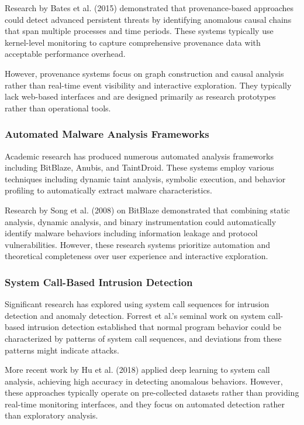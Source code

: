 Research by Bates et al. (2015) demonstrated that provenance-based approaches could detect advanced persistent threats by identifying anomalous causal chains that span multiple processes and time periods. These systems typically use kernel-level monitoring to capture comprehensive provenance data with acceptable performance overhead.

However, provenance systems focus on graph construction and causal analysis rather than real-time event visibility and interactive exploration. They typically lack web-based interfaces and are designed primarily as research prototypes rather than operational tools.

\subsubsection{Automated Malware Analysis Frameworks}
Academic research has produced numerous automated analysis frameworks including BitBlaze, Anubis, and TaintDroid. These systems employ various techniques including dynamic taint analysis, symbolic execution, and behavior profiling to automatically extract malware characteristics.

Research by Song et al. (2008) on BitBlaze demonstrated that combining static analysis, dynamic analysis, and binary instrumentation could automatically identify malware behaviors including information leakage and protocol vulnerabilities. However, these research systems prioritize automation and theoretical completeness over user experience and interactive exploration.

\subsubsection{System Call-Based Intrusion Detection}
Significant research has explored using system call sequences for intrusion detection and anomaly detection. Forrest et al.'s seminal work on system call-based intrusion detection established that normal program behavior could be characterized by patterns of system call sequences, and deviations from these patterns might indicate attacks.

More recent work by Hu et al. (2018) applied deep learning to system call analysis, achieving high accuracy in detecting anomalous behaviors. However, these approaches typically operate on pre-collected datasets rather than providing real-time monitoring interfaces, and they focus on automated detection rather than exploratory analysis.

